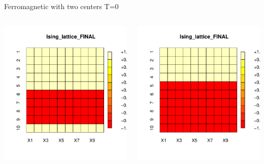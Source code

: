 \documentclass{beamer}
\begin{document}
\begin{frame}{Ferromagnetic with two centers T=0}
\begin{columns}
\begin{column}{0.5\textwidth}
    \begin{center}
     \includegraphics[width=\textwidth]{Pic/J+1_10_6000_two_center_T=0_FINAL.pdf}
     \end{center}
\end{column}
\begin{column}{0.5\textwidth}
    \begin{center}
     \includegraphics[width=\textwidth]{Pic/J+1_10_6000_two_center_T=0_2_FINAL.pdf}

\end{center}
\end{column}
\end{columns}
\end{frame}
\end{document}
